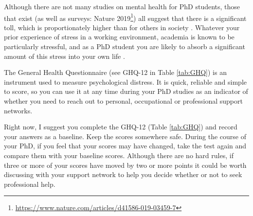 \documentclass[
]{krantz}
\renewcommand{\href}[2]{#2\footnote{\url{#1}}}
\begin{document}
Although there are not many studies on mental health for PhD students, those that exist (as well as surveys: \href{https://www.nature.com/articles/d41586-019-03459-7}{Nature 2019}) all suggest that there is a significant toll, which is proportionately higher than for others in society \citep{levecque2017work}. Whatever your prior experience of stress in a working environment, academia is known to be particularly stressful, and as a PhD student you are likely to absorb a significant amount of this stress into your own life \citep{stubb2011balancing}.

The General Health Questionnaire (see GHQ-12 in Table \ref{tab:GHQ}) is an instrument used to measure psychological distress. It is quick, reliable and simple to score, so you can use it at any time during your PhD studies as an indicator of whether you need to reach out to personal, occupational or professional support networks.

Right now, I suggest you complete the GHQ-12 (Table \ref{tab:GHQ}) and record your answers as a baseline. Keep the scores somewhere safe. During the course of your PhD, if you feel that your scores may have changed, take the test again and compare them with your baseline scores. Although there are no hard rules, if three or more of your scores have moved by two or more points it could be worth discussing with your support network to help you decide whether or not to seek professional help.
\end{document}
